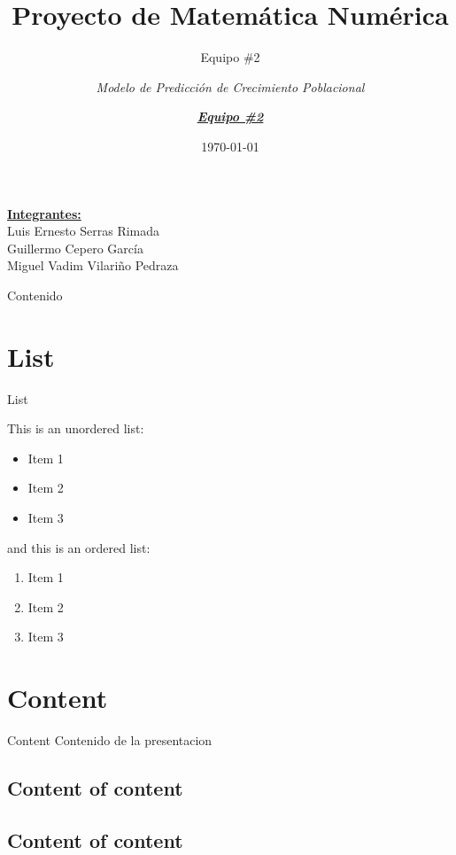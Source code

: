 \documentclass{beamer}
\title{Proyecto de Matemática Numérica}
\subtitle{Equipo \#2}
\author{\textit{Modelo de Predicción de Crecimiento Poblacional}}
\date{\today}
\begin{document}
\begin{frame}
    \titlepage 
    \underline{\textbf{Integrantes: }}\\
    Luis Ernesto Serras Rimada \\ Guillermo Cepero García \\ Miguel Vadim Vilariño Pedraza
\end{frame}

\logo{}
\author{\textit{\underline{\textbf{Equipo \#2}}}}


\begin{frame}{Contenido}
    \tableofcontents
\end{frame}


\section{List}
\begin{frame}{List}

This is an unordered list:
\begin{itemize}
    \item Item 1
    \item Item 2
    \item Item 3
\end{itemize}

and this is an ordered list:
\begin{enumerate}
    \item Item 1
    \item Item 2
    \item Item 3
\end{enumerate}

\end{frame}

\section{Content}
\begin{frame}{Content}
Contenido de la presentacion
\end{frame}

\subsection{Content of content}
\begin{frame}
\end{frame}

\subsection{Content of content}
\begin{frame}
\end{frame}
\end{document}
